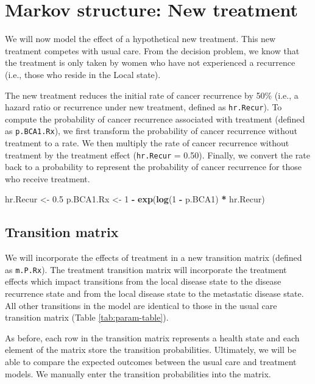 \documentclass[]{article}
\newenvironment{Shaded}{\begin{snugshade}}{\end{snugshade}}
\newcommand{\KeywordTok}[1]{\textcolor[rgb]{0.13,0.29,0.53}{\textbf{#1}}}
\newcommand{\DecValTok}[1]{\textcolor[rgb]{0.00,0.00,0.81}{#1}}
\newcommand{\FloatTok}[1]{\textcolor[rgb]{0.00,0.00,0.81}{#1}}
\newcommand{\StringTok}[1]{\textcolor[rgb]{0.31,0.60,0.02}{#1}}
\newcommand{\OperatorTok}[1]{\textcolor[rgb]{0.81,0.36,0.00}{\textbf{#1}}}
\newcommand{\NormalTok}[1]{#1}
\theoremstyle{definition}
\theoremstyle{definition}
\theoremstyle{definition}
\theoremstyle{remark}
\begin{document}
\section{Markov structure: New
treatment}\label{markov-structure-new-treatment}

We will now model the effect of a hypothetical new treatment. This new
treatment competes with usual care. From the decision problem, we know
that the treatment is only taken by women who have not experienced a
recurrence (i.e., those who reside in the Local state).

The new treatment reduces the initial rate of cancer recurrence by 50\%
(i.e., a hazard ratio or recurrence under new treatment, defined as
\texttt{hr.Recur}). To compute the probability of cancer recurrence
associated with treatment (defined as \texttt{p.BCA1.Rx}), we first
transform the probability of cancer recurrence without treatment to a
rate. We then multiply the rate of cancer recurrence without treatment
by the treatment effect (\texttt{hr.Recur} = 0.50). Finally, we convert
the rate back to a probability to represent the probability of cancer
recurrence for those who receive treatment.

\begin{Shaded}
\begin{Highlighting}[]
\NormalTok{hr.Recur   <-}\StringTok{ }\FloatTok{0.5}
\NormalTok{p.BCA1.Rx  <-}\StringTok{ }\DecValTok{1} \OperatorTok{-}\StringTok{ }\KeywordTok{exp}\NormalTok{(}\KeywordTok{log}\NormalTok{(}\DecValTok{1} \OperatorTok{-}\StringTok{ }\NormalTok{p.BCA1) }\OperatorTok{*}\StringTok{ }\NormalTok{hr.Recur)}
\end{Highlighting}
\end{Shaded}

\subsection{Transition matrix}\label{transition-matrix-1}

We will incorporate the effects of treatment in a new transition matrix
(defined as \texttt{m.P.Rx}). The treatment transition matrix will
incorporate the treatment effects which impact transitions from the
local disease state to the disease recurrence state and from the local
disease state to the metastatic disease state. All other transitions in
the model are identical to those in the usual care transition matrix
(Table \ref{tab:param-table}).

As before, each row in the transition matrix represents a health state
and each element of the matrix store the transition probabilities.
Ultimately, we will be able to compare the expected outcomes between the
usual care and treatment models. We manually enter the transition
probabilities into the matrix.
\end{document}
